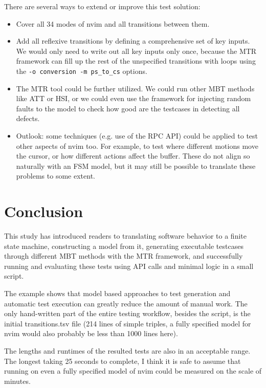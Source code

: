 \documentclass[12pt]{article}
\begin{document}
	There are several ways to extend or improve this test solution:

	\begin{itemize}
		\item{Cover all 34 modes of nvim and all transitions between them.}
		\item{Add all reflexive transitions by defining a comprehensive set of key inputs. We would only need to write out all key inputs only once, because the MTR framework can fill up the rest of the unspecified transitions with loops using the \texttt{-o conversion -m ps\_to\_cs} options.}
		\item{The MTR tool could be further utilized. We could run other MBT methods like ATT or HSI, or we could even use the framework for injecting random faults to the model to check how good are the testcases in detecting all defects.}
		\item{Outlook: some techniques (e.g. use of the RPC API) could be applied to test other aspects of nvim too. For example, to test where different motions move the cursor, or how different actions affect the buffer. These do not align so naturally with an FSM model, but it may still be possible to translate these problems to some extent.}
	\end{itemize}

\section{Conclusion}

	This study has introduced readers to translating software behavior to a finite state machine, constructing a model from it, generating executable testcases through different MBT methods with the MTR framework, and successfully running and evaluating these tests using API calls and minimal logic in a small script.

	The example shows that model based approaches to test generation and automatic test execution can greatly reduce the amount of manual work. The only hand-written part of the entire testing workflow, besides the script, is the initial transitions.tsv file (214 lines of simple triples, a fully specified model for nvim would also probably be less than 1000 lines here).

	The lengths and runtimes of the resulted tests are also in an acceptable range. The longest taking 25 seconds to complete, I think it is safe to assume that running on even a fully specified model of nvim could be measured on the scale of minutes.
\end{document}
